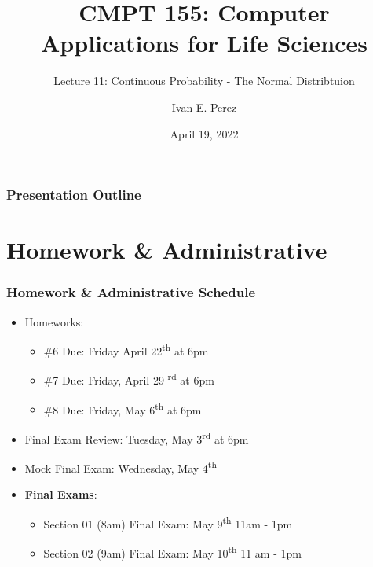 \documentclass[12pt]{beamer}
\title{CMPT 155: Computer Applications for Life Sciences}
\subtitle{Lecture 11: Continuous Probability - The Normal Distribtuion}
\author{Ivan E. Perez}
\institute{}
\date{April 19, 2022}
\begin{document}
	
	\begin{frame}
		\titlepage
	\end{frame}
	
	\begin{frame}
		\frametitle{Presentation Outline}
		\tableofcontents
	\end{frame}
	\section{Homework \& Administrative}
	
	\begin{frame}
		\frametitle{Homework \& Administrative Schedule}
		\begin{itemize}
			\item Homeworks:
			\begin{itemize}	
				\item \#6 Due: Friday April 22\textsuperscript{th} at 6pm
				\item \#7 Due: Friday, April 29 \textsuperscript{rd} at 6pm
				\item \#8 Due: Friday, May 6\textsuperscript{th} at 6pm
			\end{itemize}
			\item Final Exam Review: Tuesday, May 3\textsuperscript{rd} at 6pm
			\item Mock Final Exam: Wednesday, May 4\textsuperscript{th}
			\item \textbf{Final Exams}:
			\begin{itemize}
				\item Section 01 (8am) Final Exam: May 9\textsuperscript{th} 11am - 1pm
				\item Section 02 (9am) Final Exam: May 10\textsuperscript{th} 11 am - 1pm
			\end{itemize}
		\end{itemize}
	\end{frame}
\end{document}

